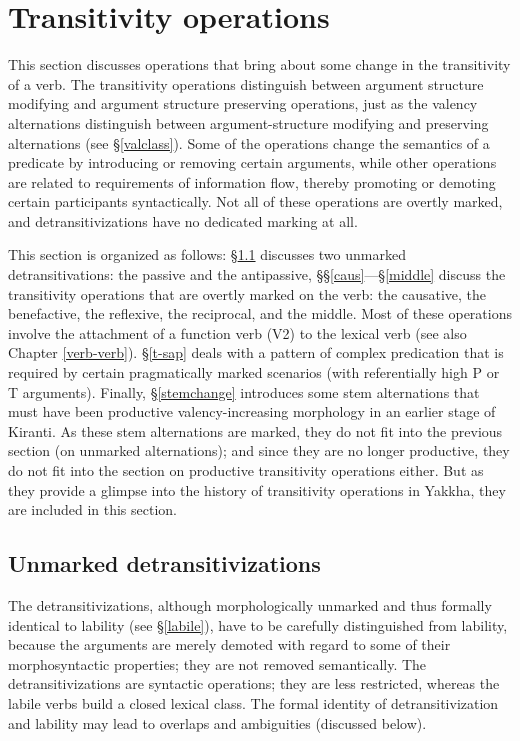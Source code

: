 \section{Transitivity operations}\label{trans-op}

This section discusses operations that bring about some change in the transitivity of a verb. The transitivity operations distinguish between argument structure modifying and argument structure preserving operations, just as the valency alternations distinguish between argument-structure modifying and preserving alternations (see  §\ref{valclass}). Some of the operations change the semantics of a predicate by introducing or removing certain arguments, while other operations are related to requirements of information flow, thereby promoting or demoting certain participants syntactically. Not all of these operations are overtly marked, and detransitivizations have no dedicated marking at all.  

This section is organized as follows: §\ref{detrans} discusses two unmarked detransitivations: the passive and the antipassive, §§\ref{caus}—§\ref{middle} discuss the transitivity operations that are overtly marked on the verb: the causative, the benefactive, the reflexive, the  reciprocal, and the middle. Most of these operations involve the attachment of a function verb  (V2) to the lexical verb (see also Chapter \ref{verb-verb}). §\ref{t-sap} deals with a pattern of complex predication that is required by certain pragmatically marked scenarios (with referentially high P or T arguments). Finally, §\ref{stemchange} introduces some stem alternations that must have been productive valency-increasing morphology  in an earlier stage of Kiranti. As these stem alternations are marked, they do not fit into the previous section (on unmarked alternations); and since they are no longer productive, they do not fit into the section on productive transitivity operations either. But as they provide a glimpse into the history of transitivity operations in Yakkha, they are included in this section.

\subsection{Unmarked detransitivizations}\label{detrans}

The detransitivizations, although morphologically unmarked and thus  formally identical to lability (see §\ref{labile}), have to be carefully distinguished from lability, because the arguments are merely demoted with regard to some of their morphosyntactic properties; they are not removed semantically. The detransitivizations are syntactic operations; they are less restricted, whereas the labile verbs build a closed lexical class. The formal identity of detransitivization and lability may lead to overlaps and ambiguities (discussed below).

